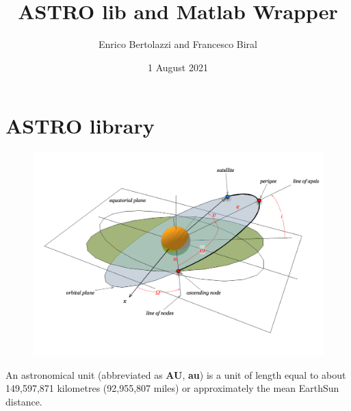 \documentclass[12pt]{article}
\title{\textbf{ASTRO} lib and Matlab Wrapper}
\author{Enrico Bertolazzi and Francesco Biral} %
\date{1 August 2021}
\begin{document}
\maketitle						


\section{\textbf{ASTRO} library}

\begin{figure}[h!]
	\includegraphics[width=1.0\textwidth]{coordinates}
\end{figure}


An astronomical unit (abbreviated as \textbf{AU}, \textbf{au}) is a unit of length equal to about 149,597,871 kilometres (92,955,807 miles) or approximately the mean EarthSun distance.
\end{document}
